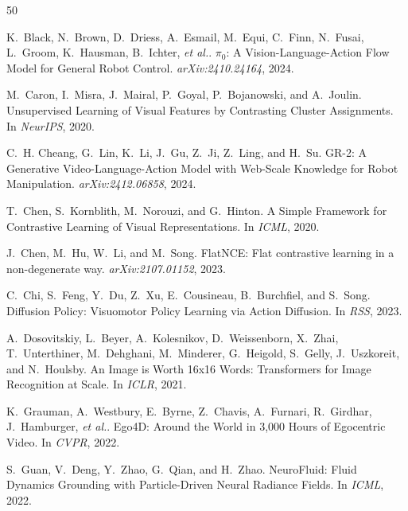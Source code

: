 \documentclass{article}
\newcommand{\etal}{\textit{et al.}}
\begin{document}
{\small

\begin{thebibliography}{50}

K.~Black, N.~Brown, D.~Driess, A.~Esmail, M.~Equi, C.~Finn, N.~Fusai, L.~Groom, K.~Hausman, B.~Ichter, \etal.
\newblock $\pi_0$: A Vision-Language-Action Flow Model for General Robot Control.
\newblock \emph{arXiv:2410.24164}, 2024.

M.~Caron, I.~Misra, J.~Mairal, P.~Goyal, P.~Bojanowski, and A.~Joulin.
\newblock Unsupervised Learning of Visual Features by Contrasting Cluster Assignments.
\newblock In \emph{NeurIPS}, 2020.

C.~H. Cheang, G.~Lin, K.~Li, J.~Gu, Z.~Ji, Z.~Ling, and H.~Su.
\newblock GR-2: A Generative Video-Language-Action Model with Web-Scale Knowledge for Robot Manipulation.
\newblock \emph{arXiv:2412.06858}, 2024.

T.~Chen, S.~Kornblith, M.~Norouzi, and G.~Hinton.
\newblock A Simple Framework for Contrastive Learning of Visual Representations.
\newblock In \emph{ICML}, 2020.

J.~Chen, M.~Hu, W.~Li, and M.~Song.
\newblock FlatNCE: Flat contrastive learning in a non-degenerate way.
\newblock \emph{arXiv:2107.01152}, 2023.

C.~Chi, S.~Feng, Y.~Du, Z.~Xu, E.~Cousineau, B.~Burchfiel, and S.~Song.
\newblock Diffusion Policy: Visuomotor Policy Learning via Action Diffusion.
\newblock In \emph{RSS}, 2023.

A.~Dosovitskiy, L.~Beyer, A.~Kolesnikov, D.~Weissenborn, X.~Zhai, T.~Unterthiner, M.~Dehghani, M.~Minderer, G.~Heigold, S.~Gelly, J.~Uszkoreit, and N.~Houlsby.
\newblock An Image is Worth 16x16 Words: Transformers for Image Recognition at Scale.
\newblock In \emph{ICLR}, 2021.

K.~Grauman, A.~Westbury, E.~Byrne, Z.~Chavis, A.~Furnari, R.~Girdhar, J.~Hamburger, \etal.
\newblock Ego4D: Around the World in 3,000 Hours of Egocentric Video.
\newblock In \emph{CVPR}, 2022.

S.~Guan, V.~Deng, Y.~Zhao, G.~Qian, and H.~Zhao.
\newblock NeuroFluid: Fluid Dynamics Grounding with Particle-Driven Neural Radiance Fields.
\newblock In \emph{ICML}, 2022.


\end{thebibliography}}
\end{document}
